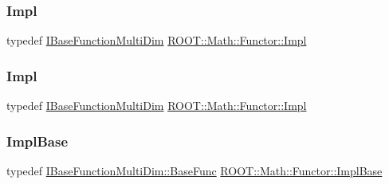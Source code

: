 \subsubsection{\texorpdfstring{Impl}{Impl}\hspace{0.1cm}{\footnotesize\ttfamily [1/2]}}
{\footnotesize\ttfamily typedef \mbox{\hyperlink{classROOT_1_1Math_1_1IBaseFunctionMultiDim}{I\+Base\+Function\+Multi\+Dim}} \mbox{\hyperlink{classROOT_1_1Math_1_1Functor_aef374d72e63fb0fea13a8cc3d4f2091b}{R\+O\+O\+T\+::\+Math\+::\+Functor\+::\+Impl}}}

\mbox{\label{classROOT_1_1Math_1_1Functor_aef374d72e63fb0fea13a8cc3d4f2091b}} 
\subsubsection{\texorpdfstring{Impl}{Impl}\hspace{0.1cm}{\footnotesize\ttfamily [2/2]}}
{\footnotesize\ttfamily typedef \mbox{\hyperlink{classROOT_1_1Math_1_1IBaseFunctionMultiDim}{I\+Base\+Function\+Multi\+Dim}} \mbox{\hyperlink{classROOT_1_1Math_1_1Functor_aef374d72e63fb0fea13a8cc3d4f2091b}{R\+O\+O\+T\+::\+Math\+::\+Functor\+::\+Impl}}}

\mbox{\label{classROOT_1_1Math_1_1Functor_acc5dacb213f26296122e95138f5153b3}} 
\subsubsection{\texorpdfstring{ImplBase}{ImplBase}\hspace{0.1cm}{\footnotesize\ttfamily [1/2]}}
{\footnotesize\ttfamily typedef \mbox{\hyperlink{classROOT_1_1Math_1_1IBaseFunctionMultiDim_a44c87c3e8c23d140cc3bf067d6480070}{I\+Base\+Function\+Multi\+Dim\+::\+Base\+Func}} \mbox{\hyperlink{classROOT_1_1Math_1_1Functor_acc5dacb213f26296122e95138f5153b3}{R\+O\+O\+T\+::\+Math\+::\+Functor\+::\+Impl\+Base}}}

\mbox{\label{classROOT_1_1Math_1_1Functor_acc5dacb213f26296122e95138f5153b3}} 
